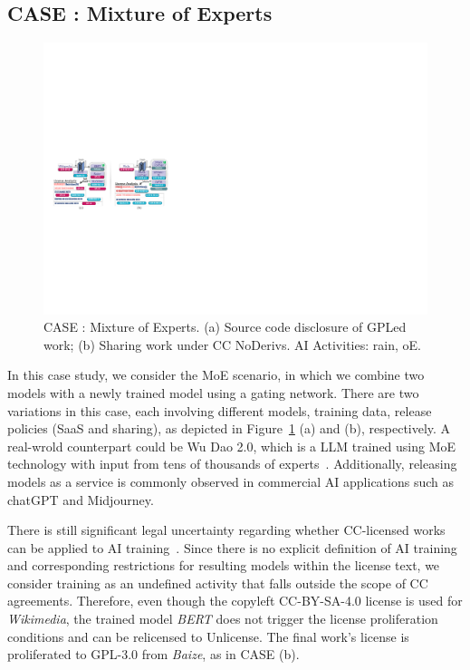 \subsection{CASE  : Mixture of Experts}

\begin{figure}[h]
    \centering
    \includegraphics[width=\linewidth]{fig/case2.pdf}
    \caption{CASE : Mixture of Experts. (a) Source code disclosure of GPLed work; (b) Sharing work under CC NoDerivs. AI Activities: rain, oE.}
    \Description{}
    \label{fig:case2}
\end{figure}

In this case study, we consider the MoE scenario, in which we combine two models with a newly trained model using a gating network.
There are two variations in this case, each involving different models, training data, release policies (SaaS and sharing), as depicted in Figure~\ref{fig:case2} (a) and (b), respectively.
A real-wrold counterpart could be Wu Dao 2.0, which is a LLM trained using MoE technology with input from tens of thousands of experts~\cite{he2022fastermoe}.
Additionally, releasing models as a service is commonly observed in commercial AI applications such as chatGPT and Midjourney.

There is still significant legal uncertainty regarding whether CC-licensed works can be applied to AI training~\cite{creative2023artificial}.
Since there is no explicit definition of AI training and corresponding restrictions for resulting models within the license text, we consider training as an undefined activity that falls outside the scope of CC agreements.
Therefore, even though the copyleft CC-BY-SA-4.0 license is used for \textit{Wikimedia}, the trained model \textit{BERT} does not trigger the license proliferation conditions and can be relicensed to Unlicense.
The final work's license is proliferated to GPL-3.0 from \textit{Baize}, as in CASE  (b).

